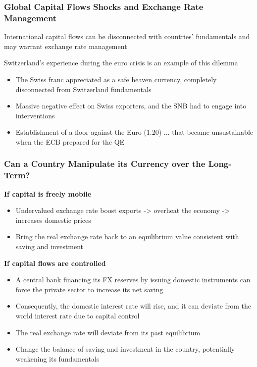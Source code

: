 \documentclass{beamer}
\newenvironment{wideitemize}{\itemize\addtolength{\itemsep}{10pt}}{\enditemize}
\begin{document}
\begin{frame}
  \frametitle{Global Capital Flows Shocks and Exchange Rate Management}

  \begin{wideitemize}
  \item International capital flows can be disconnected with countries' fundamentals and may warrant exchange rate management
  \item Switzerland's experience during the euro crisis is an example of this dilemma
    \begin{itemize}
    \item The Swiss franc appreciated as a safe heaven currency, completely disconnected from Switzerland fundamentals
    \item Massive negative effect on Swiss exporters, and the SNB had to engage into interventions
    \item Establishment of a floor against the Euro (1.20) ... that became unsustainable when the ECB prepared for the QE
    \end{itemize}
  \end{wideitemize}
  
\end{frame}


\begin{frame}
  \frametitle{Can a Country Manipulate its Currency over the Long-Term?}
  \begin{wideitemize}
  \item \textbf{If capital is freely mobile}
    \begin{itemize}
      \item Undervalued exchange rate boost exports -> overheat the economy -> increases domestic prices
      \item Bring the real exchange rate back to an equilibrium value consistent with saving and investment
      \end{itemize}
    \item \textbf{If capital flows are controlled}
      \begin{itemize}
      \item A central bank financing its FX reserves by issuing domestic instruments can force the private sector to increase its net saving
      \item Consequently, the domestic interest rate will rise, and it can deviate from the world interest rate due to capital control
      \item The real exchange rate will deviate from its past equilibrium
      \item Change the balance of saving and investment in the country, potentially weakening its fundamentals
      \end{itemize}
  \end{wideitemize}
\end{frame}
\end{document}
